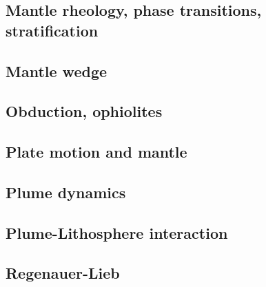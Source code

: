 \subsection*{Mantle rheology, phase transitions, stratification}

\cite{yusb82}
\cite{zhyh92}
\cite{tasg93}
\cite{tack12}
\cite{zhyu95}
\cite{java11}

\subsection*{Mantle wedge}

\cite{tosl78}
\cite{leki09}
\cite{roms10}
\cite{ledg14}

\subsection*{Obduction, ophiolites}

\cite{hack90}
\cite{hack91}
\cite{agzf14}

\subsection*{Plate motion and mantle}

\cite{zieg92a}
\cite{zhgm98}
\cite{lizh09}
\cite{huss12}
\cite{yoha15}

\subsection*{Plume dynamics}

\cite{nasf94}\cite{hayu94}
\cite{lays99}
\cite{isst06}
\cite{toyu11}\cite{talz11}
\cite{dagm13}
\cite{daso15}
\cite{dacc18}

\subsection*{Plume-Lithosphere interaction}

\cite{rich94}

\subsection*{Regenauer-Lieb}

